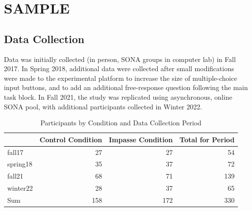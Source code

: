 \documentclass[
  letterpaper,
  DIV=11,
  numbers=noendperiod]{scrreprt}
\newenvironment{Shaded}{\begin{snugshade}}{\end{snugshade}}
\newcommand{\AttributeTok}[1]{\textcolor[rgb]{0.40,0.45,0.13}{#1}}
\newcommand{\FunctionTok}[1]{\textcolor[rgb]{0.28,0.35,0.67}{#1}}
\newcommand{\NormalTok}[1]{\textcolor[rgb]{0.00,0.23,0.31}{#1}}
\newcommand{\OtherTok}[1]{\textcolor[rgb]{0.00,0.23,0.31}{#1}}
\newcommand{\SpecialCharTok}[1]{\textcolor[rgb]{0.37,0.37,0.37}{#1}}
\newcommand{\StringTok}[1]{\textcolor[rgb]{0.13,0.47,0.30}{#1}}
\begin{document}
\hypertarget{sample-1}{%
\section{SAMPLE}\label{sample-1}}

\hypertarget{data-collection}{%
\subsection{Data Collection}\label{data-collection}}

Data was initially collected (in person, SONA groups in computer lab) in
Fall 2017. In Spring 2018, additional data were collected after small
modifications were made to the experimental platform to increase the
size of multiple-choice input buttons, and to add an additional
free-response question following the main task block. In Fall 2021, the
study was replicated using asynchronous, online SONA pool, with
additional participants collected in Winter 2022.

\begin{Shaded}
\end{Shaded}

\begin{table}

\caption{Participants by Condition and Data Collection Period}
\centering
\begin{tabular}[t]{l|r|r|r}
\hline
  & Control Condition & Impasse Condition & Total for Period\\
\hline
fall17 & 27 & 27 & 54\\
\hline
spring18 & 35 & 37 & 72\\
\hline
fall21 & 68 & 71 & 139\\
\hline
winter22 & 28 & 37 & 65\\
\hline
Sum & 158 & 172 & 330\\
\hline
\end{tabular}
\end{table}
\end{document}
